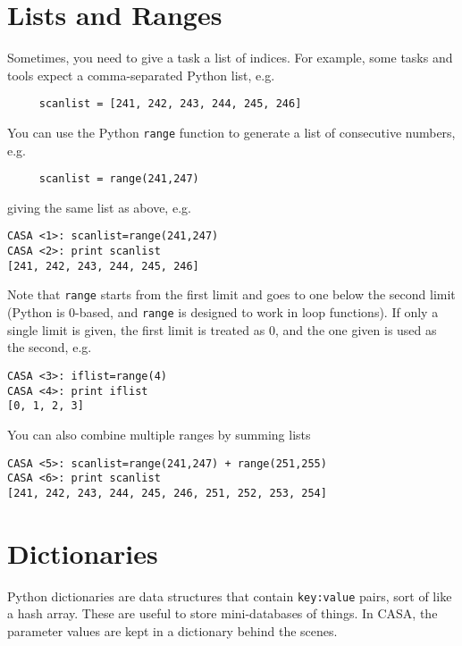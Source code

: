 \section{Lists and Ranges}
\label{section:python.lists}

Sometimes, you need to give a task a list of indices.  For example,
some tasks and tools expect a comma-separated Python list, e.g.
\small
\begin{verbatim}
     scanlist = [241, 242, 243, 244, 245, 246]
\end{verbatim}
\normalsize
You can use the Python {\tt range} function to generate a list of
consecutive numbers, e.g.
\small
\begin{verbatim}
     scanlist = range(241,247)
\end{verbatim}
\normalsize
giving the same list as above, e.g.
\small
\begin{verbatim}
CASA <1>: scanlist=range(241,247)
CASA <2>: print scanlist
[241, 242, 243, 244, 245, 246]
\end{verbatim}
\normalsize
Note that {\tt range} starts from the first limit and goes to
one below the second limit (Python is 0-based, and {\tt range}
is designed to work in loop functions).  If only a single limit
is given, the first limit is treated as 0, and the one given is
used as the second, e.g.
\small
\begin{verbatim}
CASA <3>: iflist=range(4)
CASA <4>: print iflist
[0, 1, 2, 3]
\end{verbatim}
\normalsize
You can also combine multiple ranges by summing lists
\small
\begin{verbatim}
CASA <5>: scanlist=range(241,247) + range(251,255)
CASA <6>: print scanlist
[241, 242, 243, 244, 245, 246, 251, 252, 253, 254]
\end{verbatim}
\normalsize

\section{Dictionaries}
\label{section:python.dict}

Python dictionaries are data structures that contain {\tt key:value}
pairs, sort of like a hash array.  These are useful to store
mini-databases of things.  In CASA, the parameter values are kept
in a dictionary behind the scenes.

